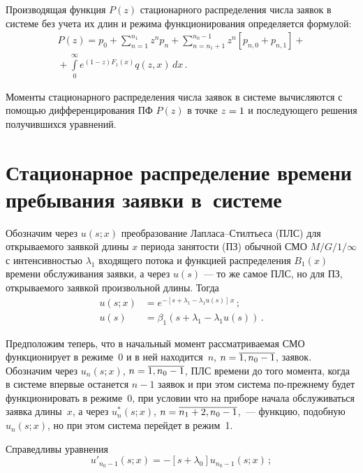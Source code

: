 \begin{multicols}{2}
Производящая функция $P(z)$ стационарного распределения числа заявок в
системе без учета их длин и режима функционирования
определяется формулой:
\begin{multline*}
P(z) = p_0 + \sum\limits_{n=1}^{n_1} z^n p_{n} +
\sum\limits_{n=n_1+1}^{n_0-1} z^n \left[p_{n,0} + p_{n,1}\right]
+{}\\
{}+ \int\limits_0^\infty e^{(1-z) F_1(x)} q(z,x)\, dx\,.
\end{multline*}

Моменты стационарного распределения числа заявок
в системе вычисляются с помощью дифференцирования
ПФ $P(z)$ в точке $z\hm=1$ и по\-сле\-ду\-юще\-го решения
получившихся уравнений.

\section{Стационарное распределение времени пребывания
заявки в~системе}

Обозначим через $u(s;x)$ преобразование Лап\-ла\-са--Стилть\-еса
(ПЛС) для открываемого заявкой длины
$x$ периода занятости (ПЗ) обычной СМО $M/G/1/\infty$
с интенсивностью $\lambda_1$ входящего потока и функцией распределения $B_1(x)$
времени обслуживания заявки,
а через $u(s)$ --- то же самое ПЛС, но для ПЗ, открываемого
заявкой произвольной длины.
Тогда
\begin{align*}
u(s;x)&= e^{-[s + \lambda_1 - \lambda_1 u(s)]\,x}\,;
\\
u(s) &= \beta_1(s + \lambda_1 - \lambda_1 u(s))\,.
\end{align*}

Предположим теперь, что в начальный момент
рассматриваемая СМО функционирует в режиме~0 и
в ней находится~$n$, $n\hm=\overline{1,n_0-1}$,
заявок.
Обозначим через $u_n(s;x)$, $n\hm=\overline{1,n_0-1}$, ПЛС времени до того момента,
когда в системе впервые останется $n-1$ заявок
и при этом система по-преж\-не\-му будет функционировать
в режиме~0, при условии что на приборе начала
обслуживаться заявка длины~$x$, а через $u^*_n(s;x)$, $n\hm=\overline{n_1+2,n_0-1}$,~--- 
функцию, подобную $u_n(s;x)$, но при этом система перейдет в режим~1.

Справедливы уравнения
\begin{equation}
\label{5-1-m}
u'_{n_0-1}(s;x) = - \left[s + \lambda_0\right] u_{n_0-1}(s;x)\,;
\end{equation}

\vspace*{-12pt}


\end{multicols}
